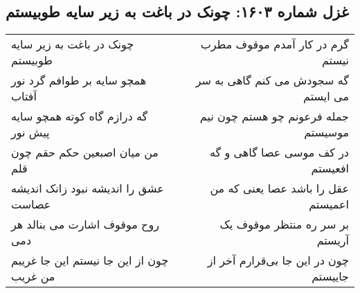 \begin{center}
\section*{غزل شماره ۱۶۰۳: چونک در باغت به زیر سایه طوبیستم}
\label{sec:1603}
\begin{longtable}{l p{0.5cm} r}
چونک در باغت به زیر سایه طوبیستم
&&
گرم در کار آمدم موقوف مطرب نیستم
\\
همچو سایه بر طوافم گرد نور آفتاب
&&
گه سجودش می کنم گاهی به سر می ایستم
\\
گه درازم گاه کوته همچو سایه پیش نور
&&
جمله فرعونم چو هستم چون نیم موسیستم
\\
من میان اصبعین حکم حقم چون قلم
&&
در کف موسی عصا گاهی و گه افعیستم
\\
عشق را اندیشه نبود زانک اندیشه عصاست
&&
عقل را باشد عصا یعنی که من اعمیستم
\\
روح موقوف اشارت می بنالد هر دمی
&&
بر سر ره منتظر موقوف یک آریستم
\\
چون از این جا نیستم این جا غریبم من غریب
&&
چون در این جا بی‌قرارم آخر از جاییستم
\\
\end{longtable}
\end{center}
